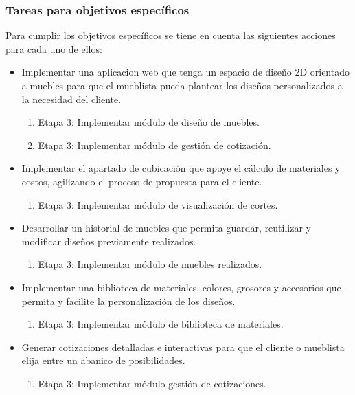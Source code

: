 \documentclass[12pt,oneside]{article}
\begin{document}
\subsubsection{Tareas para objetivos específicos}
Para cumplir los objetivos específicos se tiene en cuenta las siguientes
 acciones para cada uno de ellos:

\begin{itemize}
\item Implementar una aplicacion web que tenga un espacio de diseño 2D orientado a muebles para que el mueblista pueda plantear los diseños personalizados a la necesidad del cliente.
\begin{enumerate}
\item Etapa 3: Implementar módulo de diseño de muebles.
\item  Etapa 3: Implementar módulo de gestión de cotización.
\end{enumerate}

\item Implementar el apartado de cubicación que apoye el cálculo de materiales y costos, agilizando el proceso de propuesta para el cliente.
\begin{enumerate}
\item Etapa 3: Implementar módulo de visualización de cortes.
\end{enumerate}

\item Desarrollar un historial de muebles que permita guardar, reutilizar y modificar diseños previamente realizados.
\begin{enumerate}
\item Etapa 3: Implementar módulo de muebles realizados.
\end{enumerate}

\item Implementar una biblioteca de materiales, colores, grosores y accesorios que permita y facilite la personalización de los diseños.
\begin{enumerate}
\item Etapa 3: Implementar módulo de biblioteca de materiales.
\end{enumerate}

\item Generar cotizaciones detalladas e interactivas para que el cliente o mueblista elija entre un abanico de posibilidades.
\begin{enumerate}
\item Etapa 3: Implementar módulo gestión de cotizaciones.
\end{enumerate}


\end{itemize}
\end{document}
